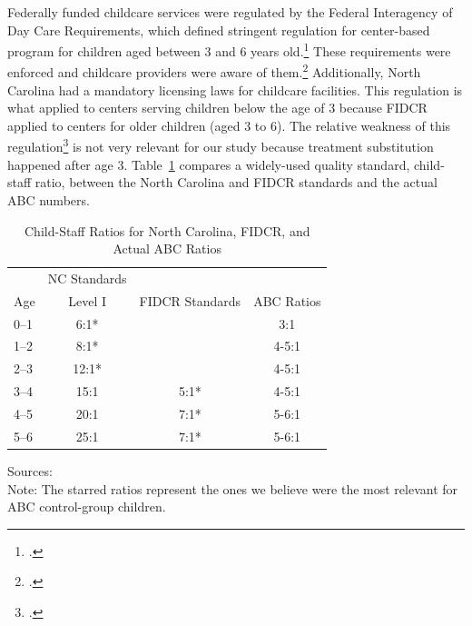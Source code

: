 \begin{appendices}
\noindent Federally funded childcare services were regulated by the Federal Interagency of Day Care Requirements, which defined stringent regulation for center-based program for children aged between 3 and 6 years old.\footnote{\citet{Department-of-Health_1968_DayCareRequirements}.} These requirements were enforced and childcare providers were aware of them.\footnote{\citet{Kuperman_2015_Clifford-Russell-Interview}.} Additionally, North Carolina had a mandatory licensing laws for childcare facilities. This regulation is what applied to centers serving children below the age of 3 because FIDCR applied to centers for older children (aged 3 to 6). The relative weakness of this regulation\footnote{\citet{NCGA_1971_House-Bill-100}.} is not very relevant for our study because treatment substitution happened after age 3. Table~\ref{table:staff} compares a widely-used quality standard, child-staff ratio, between the North Carolina and FIDCR standards and the actual ABC numbers.

\begin{table}[H]
\caption{Child-Staff Ratios for North Carolina, FIDCR, and Actual ABC Ratios}
\label{table:staff}
\begin{threeparttable}
\begin{tabular}{lccc}
\hline \hline
 &NC Standards &	&  \\
Age	& Level I & FIDCR Standards  & ABC Ratios\\ \hline
0--1	& 6:1*	&  				& 	3:1					\\
1--2	& 8:1* 	& 				&   4-5:1				\\
2--3	& 12:1* & 				& 	4-5:1				\\
3--4	& 15:1 	& 		5:1*	& 	4-5:1 				\\
4--5	& 20:1 	& 		7:1*	& 	5-6:1 				\\
5--6 & 25:1  &		7:1*	&	5-6:1				\\
\hline \hline
\end{tabular}
\begin{tablenotes}
\footnotesize
Sources: \cite{Department-of-Health_1968_DayCareRequirements,NCGA_1971_House-Bill-100,Ramey-et-al_1977_Intro-to-ABC,Ramey_Campbell_1979_SR,Ramey_McGinness_etal_1982_Abecedarianapproach} \\
Note: The starred ratios represent the ones we believe were the most relevant for ABC control-group children.
\end{tablenotes}
\end{threeparttable}
\end{table}


\end{appendices}
